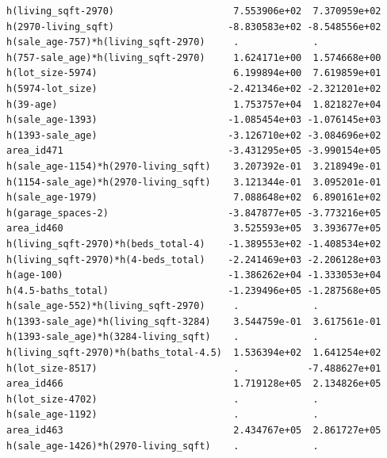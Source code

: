 \documentclass[
]{article}
\begin{document}
\begin{verbatim}
h(living_sqft-2970)                     7.553906e+02  7.370959e+02
h(2970-living_sqft)                    -8.830583e+02 -8.548556e+02
h(sale_age-757)*h(living_sqft-2970)     .             .           
h(757-sale_age)*h(living_sqft-2970)     1.624171e+00  1.574668e+00
h(lot_size-5974)                        6.199894e+00  7.619859e+01
h(5974-lot_size)                       -2.421346e+02 -2.321201e+02
h(39-age)                               1.753757e+04  1.821827e+04
h(sale_age-1393)                       -1.085454e+03 -1.076145e+03
h(1393-sale_age)                       -3.126710e+02 -3.084696e+02
area_id471                             -3.431295e+05 -3.990154e+05
h(sale_age-1154)*h(2970-living_sqft)    3.207392e-01  3.218949e-01
h(1154-sale_age)*h(2970-living_sqft)    3.121344e-01  3.095201e-01
h(sale_age-1979)                        7.088648e+02  6.890161e+02
h(garage_spaces-2)                     -3.847877e+05 -3.773216e+05
area_id460                              3.525593e+05  3.393677e+05
h(living_sqft-2970)*h(beds_total-4)    -1.389553e+02 -1.408534e+02
h(living_sqft-2970)*h(4-beds_total)    -2.241469e+03 -2.206128e+03
h(age-100)                             -1.386262e+04 -1.333053e+04
h(4.5-baths_total)                     -1.239496e+05 -1.287568e+05
h(sale_age-552)*h(living_sqft-2970)     .             .           
h(1393-sale_age)*h(living_sqft-3284)    3.544759e-01  3.617561e-01
h(1393-sale_age)*h(3284-living_sqft)    .             .           
h(living_sqft-2970)*h(baths_total-4.5)  1.536394e+02  1.641254e+02
h(lot_size-8517)                        .            -7.488627e+01
area_id466                              1.719128e+05  2.134826e+05
h(lot_size-4702)                        .             .           
h(sale_age-1192)                        .             .           
area_id463                              2.434767e+05  2.861727e+05
h(sale_age-1426)*h(2970-living_sqft)    .             .           
                                                                  

\end{verbatim}
\end{document}
